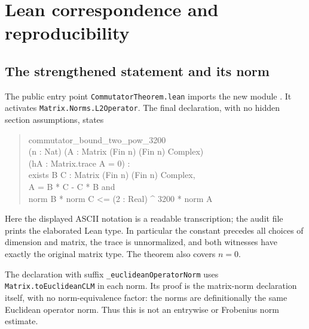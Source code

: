 \documentclass[11pt]{article}
\theoremstyle{remark}
\numberwithin{equation}{section}
\begin{document}
\appendix
\section{Lean correspondence and reproducibility}\label{sec:formal}
\subsection{The strengthened statement and its norm}
The public entry point \texttt{CommutatorTheorem.lean} imports the new module
. It activates
\texttt{Matrix.Norms.L2Operator}. The final declaration, with no hidden
section assumptions, states
\begin{quote}\small\ttfamily
commutator\_bound\_two\_pow\_3200\\
(n : Nat) (A : Matrix (Fin n) (Fin n) Complex)\\
(hA : Matrix.trace A = 0) :\\
\hspace*{1em}exists B C : Matrix (Fin n) (Fin n) Complex,\\
\hspace*{2em}A = B * C - C * B and\\
\hspace*{2em}norm B * norm C <= (2 : Real) \^{} 3200 * norm A
\end{quote}
Here the displayed ASCII notation is a readable transcription; the audit file
prints the elaborated Lean type. In particular the constant precedes all
choices of dimension and matrix, the trace is unnormalized, and both witnesses
have exactly the original matrix type. The theorem also covers $n=0$.

The declaration with suffix
\texttt{\_euclideanOperatorNorm} uses
\texttt{Matrix.toEuclideanCLM} in each norm. Its proof is the matrix-norm
declaration itself, with no norm-equivalence factor: the norms are definitionally
the same Euclidean operator norm. Thus this is not an entrywise or Frobenius
norm estimate.
\end{document}
